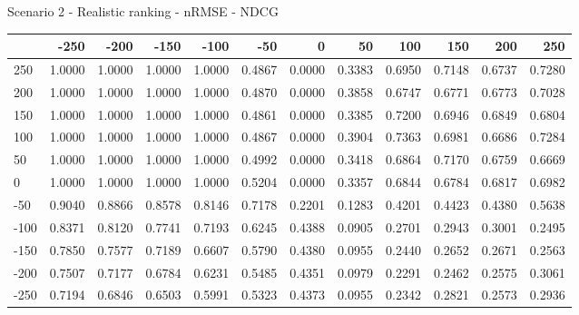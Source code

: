 Scenario 2 - Realistic ranking - nRMSE - NDCG
\begin{tabular}{lrrrrrrrrrrr}
\toprule
{} &   -250 &   -200 &   -150 &   -100 &   -50  &    0   &    50  &    100 &    150 &    200 &    250 \\
\midrule
 250 & 1.0000 & 1.0000 & 1.0000 & 1.0000 & 0.4867 & 0.0000 & 0.3383 & 0.6950 & 0.7148 & 0.6737 & 0.7280 \\
 200 & 1.0000 & 1.0000 & 1.0000 & 1.0000 & 0.4870 & 0.0000 & 0.3858 & 0.6747 & 0.6771 & 0.6773 & 0.7028 \\
 150 & 1.0000 & 1.0000 & 1.0000 & 1.0000 & 0.4861 & 0.0000 & 0.3385 & 0.7200 & 0.6946 & 0.6849 & 0.6804 \\
 100 & 1.0000 & 1.0000 & 1.0000 & 1.0000 & 0.4867 & 0.0000 & 0.3904 & 0.7363 & 0.6981 & 0.6686 & 0.7284 \\
 50  & 1.0000 & 1.0000 & 1.0000 & 1.0000 & 0.4992 & 0.0000 & 0.3418 & 0.6864 & 0.7170 & 0.6759 & 0.6669 \\
 0   & 1.0000 & 1.0000 & 1.0000 & 1.0000 & 0.5204 & 0.0000 & 0.3357 & 0.6844 & 0.6784 & 0.6817 & 0.6982 \\
-50  & 0.9040 & 0.8866 & 0.8578 & 0.8146 & 0.7178 & 0.2201 & 0.1283 & 0.4201 & 0.4423 & 0.4380 & 0.5638 \\
-100 & 0.8371 & 0.8120 & 0.7741 & 0.7193 & 0.6245 & 0.4388 & 0.0905 & 0.2701 & 0.2943 & 0.3001 & 0.2495 \\
-150 & 0.7850 & 0.7577 & 0.7189 & 0.6607 & 0.5790 & 0.4380 & 0.0955 & 0.2440 & 0.2652 & 0.2671 & 0.2563 \\
-200 & 0.7507 & 0.7177 & 0.6784 & 0.6231 & 0.5485 & 0.4351 & 0.0979 & 0.2291 & 0.2462 & 0.2575 & 0.3061 \\
-250 & 0.7194 & 0.6846 & 0.6503 & 0.5991 & 0.5323 & 0.4373 & 0.0955 & 0.2342 & 0.2821 & 0.2573 & 0.2936 \\
\bottomrule
\end{tabular}

